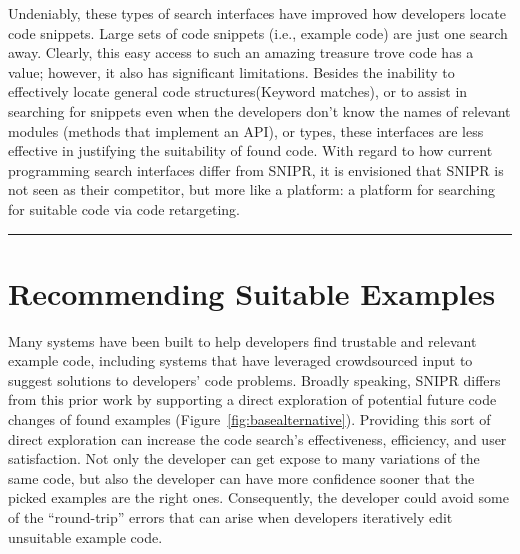 Undeniably, these types of search interfaces have improved how developers locate code snippets. Large sets of code snippets (i.e., example code) are just one search away. Clearly, this easy access to such an amazing treasure trove code has a value; however, it also has significant limitations. Besides the inability to effectively locate general code structures(Keyword matches), or to assist in searching for snippets even when the developers don't know the names of relevant modules (methods that implement an API), or types, these interfaces are less effective in justifying the suitability of found code. With regard to how current programming search interfaces differ from \uppercase{SnipR}, it is envisioned that \uppercase{SnipR} is not seen as their competitor, but more like a platform: a platform for searching for suitable code via code retargeting.
% 
% 
 
\fancybreak{\pfbreakdisplay}

\section{Recommending Suitable Examples}
\label{sec:codesearch}

Many systems have been built to help developers find trustable and relevant example code, including systems that have leveraged crowdsourced input to suggest solutions to developers' code problems. Broadly speaking, \uppercase{SnipR} differs from this prior work by supporting a direct exploration of potential future code changes of found examples (Figure~\ref{fig:basealternative}). Providing this sort of direct exploration can increase the code search's effectiveness, efficiency, and user satisfaction. Not only the developer can get expose to many variations of the same code, but also the developer can have more confidence sooner that the picked examples are the right ones. Consequently, the developer could avoid some of the ``round-trip'' errors that can arise when developers iteratively edit unsuitable example code.


